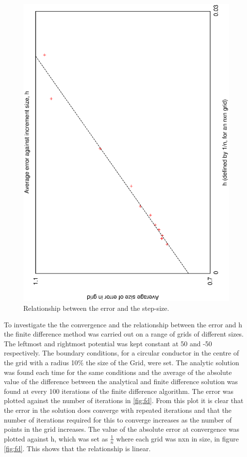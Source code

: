 \documentclass[aps,twocolumn,pre,nofootinbib]{revtex4}
\begin{document}
\begin{figure}
\includegraphics[height=\breite \columnwidth,angle=-90]{fd_err_h_fit.eps}

\caption{Relationship between the error and the step-size.}
\label{fig:fd_lin}
\end{figure}

To investigate the the convergence and the relationship between the error and h the finite difference method was carried out on a range of grids of different sizes. The leftmost and rightmost potential was kept constant at 50 and -50 respectively. The boundary conditions, for a circular conductor in the centre of the grid with a radius 10\% the size of the Grid, were set. The analytic solution was found each time for the same conditions and the average of the absolute value of the difference between the analytical and finite difference solution was found at every 100 iterations of the finite difference algorithm. The error was plotted against the number of iterations in \ref{fig:fd}. From this plot it is clear that the error in the solution does converge with repeated iterations and that the number of iterations required for this to converge increases as the number of points in the grid increases. 
The value of the absolute error at convergence was plotted against h, which was set as \(\frac{1}{n}\) where each grid was nxn in size, in figure \ref{fig:fd}. This shows that the relationship is linear. 
\end{document}
